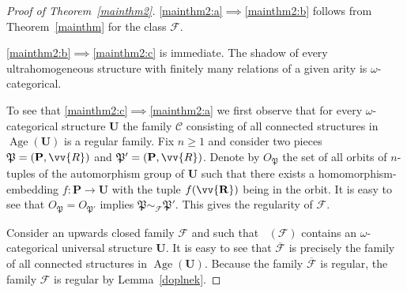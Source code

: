 \documentclass{elsarticle}
\def\Forb{\mathop{\mathrm{Forb_{he}}}\nolimits}
\def\Age{\mathop{\mathrm{Age}}\nolimits}
\def\str#1{\mathbf {#1}}
\def\F{{\mathcal F}}
\def\Piece{{\mathfrak P}}
\theoremstyle{plain}
\theoremstyle{definition}
\theoremstyle{remark}
\begin{document}
\begin{proof}[Proof of Theorem~\ref{mainthm2}]
\ref{mainthm2:a}$\implies$\ref{mainthm2:b} follows from Theorem~\ref{mainthm} for the class $\F$.

\ref{mainthm2:b}$\implies$\ref{mainthm2:c} is immediate. The shadow of every ultrahomogeneous structure
with finitely many relations of a given arity is $\omega$-categorical.

To see that \ref{mainthm2:c}$\implies$\ref{mainthm2:a} we first observe that for every $\omega$-categorical
structure $\str{U}$ the family $\mathcal C$ 
consisting of all connected structures in
$\Age(\str{U})$ is a regular family.  Fix $n\geq 1$ and consider two pieces
$\Piece=(\str{P},\vv{R})$ and
$\Piece'=(\str{P},\vv{R})$. Denote by $O_\Piece$ the set of all
orbits of $n$-tuples of the automorphism group of $\str{U}$ such that there
exists a homomorphism-embedding $f\colon\str{P}\to \str{U}$ with the tuple
$f(\str{\vv{R}})$ being in the orbit.  It is easy to see that
$O_\Piece=O_{\Piece'}$ implies $\Piece\sim_\F\Piece'$.  This gives the 
regularity of $\F$.

Consider an upwards closed family $\F$ and such that $\Forb(\F)$ contains an
$\omega$-categorical universal structure $\str{U}$.  It is easy to see that
$\overline{\F}$ is precisely the family of all connected structures in
$\Age(\str{U})$.  Because the family $\overline{\F}$ is regular, the family
$\F$ is regular by Lemma~\ref{doplnek}. 
\end{proof}
\end{document}
